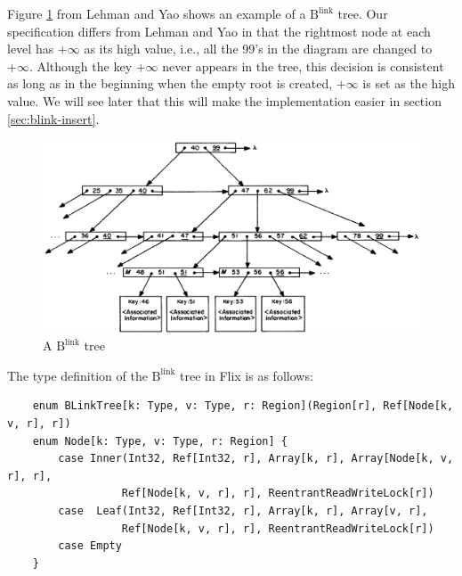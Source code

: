 \documentclass[11pt]{report}
\theoremstyle{definition}
\begin{document}
Figure \ref{fig:blink_tree} from Lehman and Yao shows an example of a $\text{B}^{\text{link}}$ tree. Our specification differs from Lehman and Yao in that the rightmost node at each level has $+\infty$ as its high value, i.e., all the 99's in the diagram are changed to $+\infty$. Although the key $+\infty$ never appears in the tree, this decision is consistent as long as in the beginning when the empty root is created, $+\infty$ is set as the high value. We will see later that this will make the implementation easier in section \ref{sec:blink-insert}.

\begin{figure}[h]
  \centering
  \vspace{0.5em}
  \includegraphics[width=\textwidth]{asset/blink_tree.png}
  \vspace{-1em}
  \caption{A $\text{B}^{\text{link}}$ tree}
  \label{fig:blink_tree}
\end{figure}

The type definition of the $\text{B}^{\text{link}}$ tree in Flix is as follows:
\begin{listing}[H]
  \begin{verbatim}
    enum BLinkTree[k: Type, v: Type, r: Region](Region[r], Ref[Node[k, v, r], r])
    enum Node[k: Type, v: Type, r: Region] {
        case Inner(Int32, Ref[Int32, r], Array[k, r], Array[Node[k, v, r], r],
                  Ref[Node[k, v, r], r], ReentrantReadWriteLock[r])
        case  Leaf(Int32, Ref[Int32, r], Array[k, r], Array[v, r],
                  Ref[Node[k, v, r], r], ReentrantReadWriteLock[r])
        case Empty
    }
\end{verbatim}
\end{listing}
\end{document}
